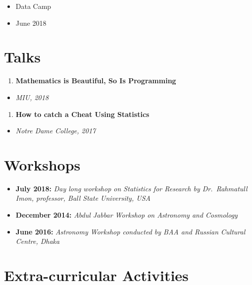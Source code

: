 \documentclass[
]{book}
\providecommand{\tightlist}{%
  \setlength{\itemsep}{0pt}\setlength{\parskip}{0pt}}
\begin{document}
\begin{itemize}
\tightlist
\item
  Data Camp
\item
  June 2018
\end{itemize}

\hypertarget{talks}{%
\section*{Talks}\label{talks}}

\begin{enumerate}
\def\labelenumi{\arabic{enumi}.}
\tightlist
\item
  \textbf{Mathematics is Beautiful, So Is Programming}
\end{enumerate}

\begin{itemize}
\tightlist
\item
  \emph{MIU, 2018}
\end{itemize}

\begin{enumerate}
\def\labelenumi{\arabic{enumi}.}
\setcounter{enumi}{1}
\tightlist
\item
  \textbf{How to catch a Cheat Using Statistics}
\end{enumerate}

\begin{itemize}
\tightlist
\item
  \emph{Notre Dame College, 2017}
\end{itemize}

\hypertarget{workshops}{%
\section*{Workshops}\label{workshops}}

\begin{itemize}
\tightlist
\item
  \textbf{July 2018:} \emph{Day long workshop on Statistics for Research by Dr.~Rahmatull Imon, professor, Ball State University, USA}
\item
  \textbf{December 2014:} \emph{Abdul Jabbar Workshop on Astronomy and Cosmology}
\item
  \textbf{June 2016:} \emph{Astronomy Workshop conducted by BAA and Russian Cultural
  Centre, Dhaka}
\end{itemize}

\hypertarget{extra-curricular-activities}{%
\section*{Extra-curricular Activities}\label{extra-curricular-activities}}
\end{document}

